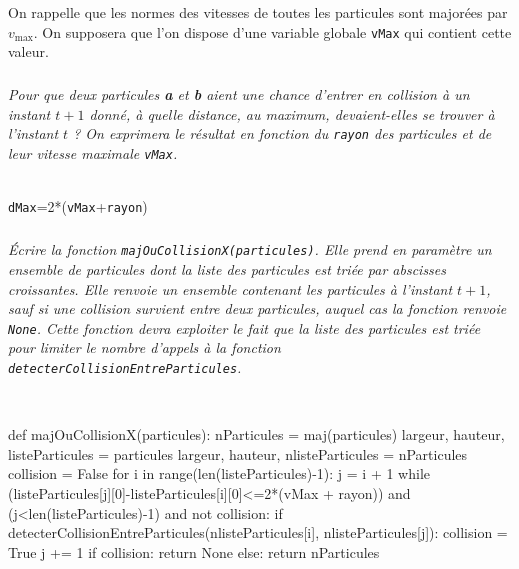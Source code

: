 \documentclass[10pt,fleqn]{article} %
\begin{document}
On rappelle que les normes des vitesses de toutes les particules sont majorées par $v_{\text{max}}$. On
supposera que l'on dispose d'une variable globale \texttt{vMax} qui contient cette valeur.
\fi

\subparagraph{}
\textit{Pour que deux particules \textbf{a} et \textbf{b} aient une chance d'entrer en collision à un instant $t+1$ donné,
à quelle distance, au maximum, devaient-elles se trouver à l'instant $t$ ? On exprimera le résultat
en fonction du \texttt{rayon} des particules et de leur vitesse maximale \texttt{vMax}.}
\ifprof
\begin{corrige}~\\
\texttt{dMax}=2*(\texttt{vMax}+\texttt{rayon})
\end{corrige}
\else
\fi


\subparagraph{}
\textit{Écrire la fonction \texttt{majOuCollisionX(particules)}. Elle prend en paramètre un ensemble de
particules dont la liste des particules est triée par abscisses croissantes. Elle renvoie un ensemble
contenant les particules à l'instant $t+1$, sauf si une collision survient entre deux particules, auquel
cas la fonction renvoie \texttt{None}. Cette fonction devra exploiter le fait que la liste des particules est
triée pour limiter le nombre d'appels à la fonction \texttt{detecterCollisionEntreParticules}.}
\ifprof
\begin{corrige}~\\
\begin{python}
def majOuCollisionX(particules):
    nParticules = maj(particules)
    largeur, hauteur, listeParticules = particules
    largeur, hauteur, nlisteParticules = nParticules
    collision = False
    for i in range(len(listeParticules)-1):
        j = i + 1
        while (listeParticules[j][0]-listeParticules[i][0]<=2*(vMax + rayon)) 
         and (j<len(listeParticules)-1) and not collision:   
            if detecterCollisionEntreParticules(nlisteParticules[i], nlisteParticules[j]):
                collision = True
            j += 1
    if collision:
        return None
    else:
        return nParticules 
\end{python}
\end{corrige}
\else
\fi
\end{document}
